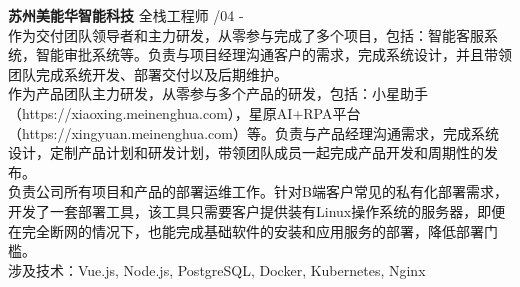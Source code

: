 \documentclass[a4paper]{article}
\newenvironment{changemargin}[2]{%
  \begin{list}{}{%
    \setlength{\topsep}{0pt}%
    \setlength{\leftmargin}{#1}%
    \setlength{\rightmargin}{#2}%
    \setlength{\listparindent}{\parindent}%
    \setlength{\itemindent}{\parindent}%
    \setlength{\parsep}{\parskip}%
  }%
  \item[]}{\end{list}
}
\newenvironment{body} {
	\vspace*{-16pt}
	\begin{changemargin}{-0.5in}{-0.5in}
  }	
	{\end{changemargin}
}
\begin{document}
\begin{body}
	\vspace{14pt}
	\textbf{苏州美能华智能科技} \hfill 全栈工程师 {/04 - }\\
	\smallskip
	作为交付团队领导者和主力研发，从零参与完成了多个项目，包括：智能客服系统，智能审批系统等。负责与项目经理沟通客户的需求，完成系统设计，并且带领团队完成系统开发、部署交付以及后期维护。\\
	\vspace{2pt}
	作为产品团队主力研发，从零参与多个产品的研发，包括：小星助手（{\fontarial https://xiaoxing.meinenghua.com}），星原{\fontarial AI+RPA}平台（{\fontarial https://xingyuan.meinenghua.com}）等。负责与产品经理沟通需求，完成系统设计，定制产品计划和研发计划，带领团队成员一起完成产品开发和周期性的发布。\\
	\vspace{2pt}
	负责公司所有项目和产品的部署运维工作。针对B端客户常见的私有化部署需求，开发了一套部署工具，该工具只需要客户提供装有Linux操作系统的服务器，即便在完全断网的情况下，也能完成基础软件的安装和应用服务的部署，降低部署门槛。\\
	\vspace{2pt}
	涉及技术：{\fontarial Vue.js, Node.js, PostgreSQL, Docker, Kubernetes, Nginx}\\


\end{body}
\end{document}
